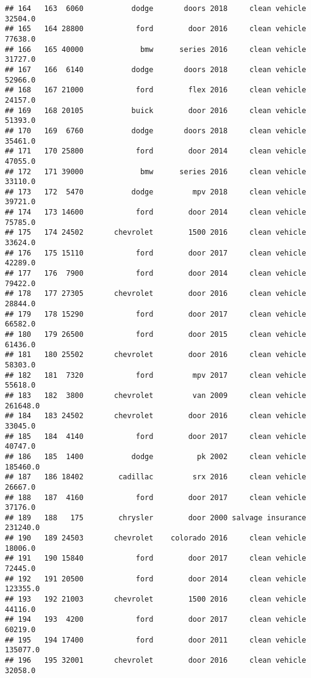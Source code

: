 \documentclass[
]{article}
\begin{document}
\begin{verbatim}
## 164   163  6060           dodge       doors 2018     clean vehicle   32504.0
## 165   164 28800            ford        door 2016     clean vehicle   77638.0
## 166   165 40000             bmw      series 2016     clean vehicle   31727.0
## 167   166  6140           dodge       doors 2018     clean vehicle   52966.0
## 168   167 21000            ford        flex 2016     clean vehicle   24157.0
## 169   168 20105           buick        door 2016     clean vehicle   51393.0
## 170   169  6760           dodge       doors 2018     clean vehicle   35461.0
## 171   170 25800            ford        door 2014     clean vehicle   47055.0
## 172   171 39000             bmw      series 2016     clean vehicle   33110.0
## 173   172  5470           dodge         mpv 2018     clean vehicle   39721.0
## 174   173 14600            ford        door 2014     clean vehicle   75785.0
## 175   174 24502       chevrolet        1500 2016     clean vehicle   33624.0
## 176   175 15110            ford        door 2017     clean vehicle   42289.0
## 177   176  7900            ford        door 2014     clean vehicle   79422.0
## 178   177 27305       chevrolet        door 2016     clean vehicle   28844.0
## 179   178 15290            ford        door 2017     clean vehicle   66582.0
## 180   179 26500            ford        door 2015     clean vehicle   61436.0
## 181   180 25502       chevrolet        door 2016     clean vehicle   58303.0
## 182   181  7320            ford         mpv 2017     clean vehicle   55618.0
## 183   182  3800       chevrolet         van 2009     clean vehicle  261648.0
## 184   183 24502       chevrolet        door 2016     clean vehicle   33045.0
## 185   184  4140            ford        door 2017     clean vehicle   40747.0
## 186   185  1400           dodge          pk 2002     clean vehicle  185460.0
## 187   186 18402        cadillac         srx 2016     clean vehicle   26667.0
## 188   187  4160            ford        door 2017     clean vehicle   37176.0
## 189   188   175        chrysler        door 2000 salvage insurance  231240.0
## 190   189 24503       chevrolet    colorado 2016     clean vehicle   18006.0
## 191   190 15840            ford        door 2017     clean vehicle   72445.0
## 192   191 20500            ford        door 2014     clean vehicle  123355.0
## 193   192 21003       chevrolet        1500 2016     clean vehicle   44116.0
## 194   193  4200            ford        door 2017     clean vehicle   60219.0
## 195   194 17400            ford        door 2011     clean vehicle  135077.0
## 196   195 32001       chevrolet        door 2016     clean vehicle   32058.0

\end{verbatim}
\end{document}
